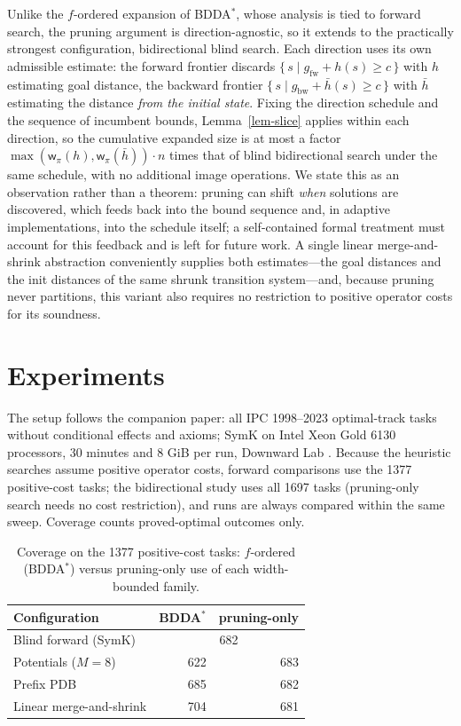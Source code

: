 \documentclass[letterpaper]{article}
\newcommand{\width}{\ensuremath{\mathsf{w}}}
\newcommand{\bddastar}{BDDA\ensuremath{^{*}}}
\theoremstyle{plain}
\theoremstyle{definition}
\theoremstyle{remark}
\begin{document}
Unlike the $f$-ordered expansion of \bddastar, whose analysis is tied to
forward search, the pruning argument is direction-agnostic, so it
extends to the practically strongest configuration, bidirectional blind
search. Each direction uses its own admissible estimate: the forward
frontier discards $\{\, s \mid g_{\mathrm{fw}} + h(s) \geq c \,\}$ with
$h$ estimating goal distance, the backward frontier
$\{\, s \mid g_{\mathrm{bw}} + \bar{h}(s) \geq c \,\}$ with $\bar{h}$
estimating the distance \emph{from the initial state}. Fixing the
direction schedule and the sequence of incumbent bounds,
Lemma~\ref{lem-slice} applies within each direction, so the cumulative
expanded size is at most a factor
$\max(\width_\pi(h), \width_\pi(\bar h)) \cdot n$ times that of blind
bidirectional search under the same schedule, with no additional image
operations. We state this as an observation rather than a theorem:
pruning can shift \emph{when} solutions are discovered, which feeds back
into the bound sequence and, in adaptive implementations, into the
schedule itself; a self-contained formal treatment must account for this
feedback and is left for future work. A single linear merge-and-shrink abstraction
conveniently supplies both estimates---the goal distances and the init
distances of the same shrunk transition system---and, because pruning
never partitions, this variant also requires no restriction to positive
operator costs for its soundness.


\section{Experiments}
\label{sec-experiments}

The setup follows the companion paper: all IPC 1998--2023 optimal-track
tasks without conditional effects and axioms; SymK on Intel Xeon Gold
6130 processors, 30 minutes and 8 GiB per run, Downward Lab
\citep{seipp-et-al-zenodo2017}. Because the heuristic searches assume
positive operator costs, forward comparisons use the 1377 positive-cost
tasks; the bidirectional study uses all 1697 tasks (pruning-only search
needs no cost restriction), and runs are always compared within the same
sweep. Coverage counts proved-optimal outcomes only.

\begin{table}[t]
\centering
\begin{tabular}{lrr}
\toprule
Configuration & \bddastar & pruning-only \\
\midrule
Blind forward (SymK) & \multicolumn{2}{c}{682} \\
Potentials ($M=8$) & 622 & 683 \\
Prefix PDB & 685 & 682 \\
Linear merge-and-shrink & 704 & 681 \\
\bottomrule
\end{tabular}
\caption{Coverage on the 1377 positive-cost tasks: $f$-ordered
(\bddastar) versus pruning-only use of each width-bounded family.}
\label{tab-coverage}
\end{table}
\end{document}

